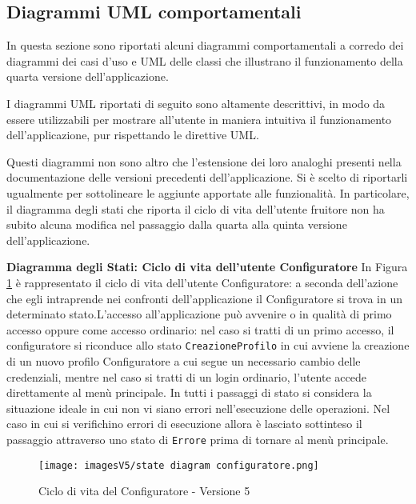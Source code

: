 \newpage
\subsection{Diagrammi UML comportamentali}
In questa sezione sono riportati alcuni diagrammi comportamentali a corredo dei diagrammi dei casi d'uso e UML delle classi che illustrano il funzionamento della quarta versione dell'applicazione.

I diagrammi UML riportati di seguito sono altamente descrittivi, in modo da essere utilizzabili per mostrare all'utente in maniera intuitiva il funzionamento dell'applicazione, pur rispettando le direttive UML.

Questi diagrammi non sono altro che l'estensione dei loro analoghi presenti nella documentazione delle versioni precedenti dell'applicazione. Si è scelto di riportarli ugualmente per sottolineare le aggiunte apportate alle funzionalità. In particolare, il diagramma degli stati che riporta il ciclo di vita dell'utente fruitore non ha subito alcuna modifica nel passaggio dalla quarta alla quinta versione dell'applicazione.\bigskip

\textbf{Diagramma degli Stati: Ciclo di vita dell'utente Configuratore}\newline
In Figura \ref{fig:State diagram 5.1} è rappresentato il ciclo di vita dell'utente Configuratore: a seconda dell'azione che egli intraprende nei confronti dell'applicazione il Configuratore si trova in un determinato stato.\newline L'accesso all'applicazione può avvenire o in qualità di primo accesso oppure come accesso ordinario: nel caso si tratti di un primo accesso, il configuratore si riconduce allo stato \texttt{CreazioneProfilo} in cui avviene la creazione di un nuovo profilo Configuratore a cui segue un necessario cambio delle credenziali, mentre nel caso si tratti di un login ordinario, l'utente accede direttamente al menù principale. \newline 
In tutti i passaggi di stato si considera la situazione ideale in cui non vi siano errori nell'esecuzione delle operazioni. Nel caso in cui si verifichino errori di esecuzione allora è lasciato sottinteso il passaggio attraverso uno stato di \texttt{Errore} prima di tornare al menù principale.

\begin{figure}[h]
\centering
\texttt{[image: imagesV5/state diagram configuratore.png]}
\caption{\label{fig:State diagram 5.1}Ciclo di vita del Configuratore - Versione 5}
\end{figure}\bigskip

